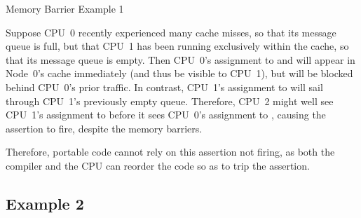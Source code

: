 \begin{listing}
\scriptsize
{}
\caption{Memory Barrier Example 1}
\label{lst:app:whymb:Memory Barrier Example 1}
\end{listing}

Suppose CPU~0 recently experienced many cache misses, so that its
message queue is full, but that CPU~1 has been running exclusively within
the cache, so that its message queue is empty.
Then CPU~0's assignment to  and  will appear in Node~0's cache
immediately (and thus be visible to CPU~1), but will be blocked behind
CPU~0's prior traffic.
In contrast, CPU~1's assignment to  will sail through CPU~1's
previously empty queue.
Therefore, CPU~2 might well see CPU~1's assignment to  before
it sees CPU~0's assignment to , causing the assertion to fire,
despite the memory barriers.

Therefore, portable code cannot rely on this assertion not firing,
as both the compiler and the CPU can reorder the code so as to trip
the assertion.

\QuickQuizEnd

\subsection{Example 2}
\label{sec:app:whymb:Example 2}

